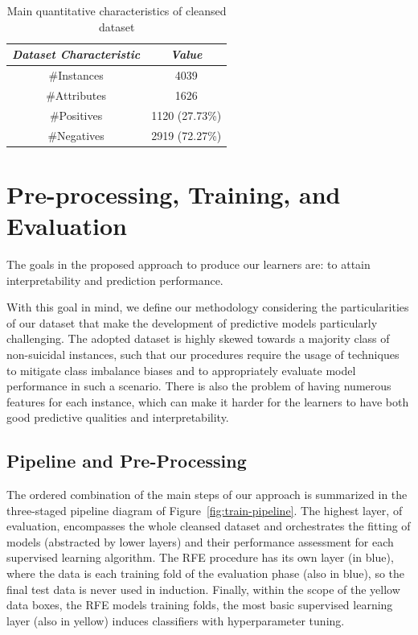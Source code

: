 \begin{table}[h]
    \caption{Main quantitative characteristics of cleansed dataset}
    \begin{center}
        \begin{tabular}{c|c}
            \textit{Dataset Characteristic} & \textit{Value} \\
            \hline
            \hline
            \#Instances                     & 4039           \\
            \#Attributes                    & 1626           \\
            \#Positives                     & 1120 (27.73\%) \\
            \#Negatives                     & 2919 (72.27\%) \\
            \hline
        \end{tabular}
    \end{center}
    \label{tab:final-dataset-characteristics}
\end{table}


\section{Pre-processing, Training, and Evaluation}\label{sec:preproc-train-eval}

The goals in the proposed approach to produce our learners are: to attain interpretability and prediction performance.

With this goal in mind, we define our methodology considering the particularities of our dataset that make the development of predictive models particularly challenging.
The adopted dataset is highly skewed towards a majority class of non-suicidal instances, such that our procedures require the usage of techniques to mitigate class imbalance biases and to appropriately evaluate model performance in such a scenario.
There is also the problem of having numerous features for each instance, which can make it harder for the learners to have both good predictive qualities and interpretability.

\subsection{Pipeline and Pre-Processing}\label{subsec:pipeline-and-preprocessing}

The ordered combination of the main steps of our approach is summarized in the three-staged pipeline diagram of Figure~\ref{fig:train-pipeline}.
The highest layer, of evaluation, encompasses the whole cleansed dataset and orchestrates the fitting of models (abstracted by lower layers) and their performance assessment for each supervised learning algorithm.
The RFE procedure has its own layer (in blue), where the data is each training fold of the evaluation phase (also in blue), so the final test data is never used in induction.
Finally, within the scope of the yellow data boxes, the RFE models training folds, the most basic supervised learning layer (also in yellow) induces classifiers with hyperparameter tuning.

